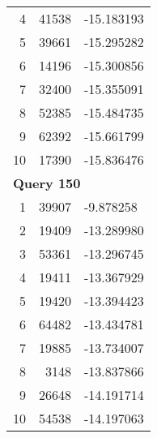 \begin{longtable}[{p}]{@{}rrp{}@{}}
4 & 41538 & -15.183193 \\
5 & 39661 & -15.295282 \\
6 & 14196 & -15.300856 \\
7 & 32400 & -15.355091 \\
8 & 52385 & -15.484735 \\
9 & 62392 & -15.661799 \\
10 & 17390 & -15.836476 \\
\midrule
\multicolumn{3}{l}{\bfseries Query 150} \\
1 & 39907 & -9.878258 \\
2 & 19409 & -13.289980 \\
3 & 53361 & -13.296745 \\
4 & 19411 & -13.367929 \\
5 & 19420 & -13.394423 \\
6 & 64482 & -13.434781 \\
7 & 19885 & -13.734007 \\
8 & 3148 & -13.837866 \\
9 & 26648 & -14.191714 \\
10 & 54538 & -14.197063 \\
\end{longtable}
